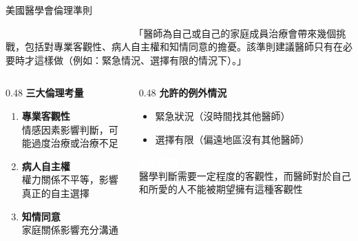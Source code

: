 \documentclass[aspectratio=169]{beamer}
\begin{document}
\begin{frame}{美國醫學會倫理準則}
\begin{block}{\textcolor{white}{AMA Code of Medical Ethics}}
「醫師為自己或自己的家庭成員治療會帶來幾個挑戰，包括對專業客觀性、病人自主權和知情同意的擔憂。該準則建議醫師只有在必要時才這樣做（例如：緊急情況、選擇有限的情況下）。」
\end{block}

\begin{columns}
\begin{column}{0.48\textwidth}
\textbf{\textcolor{medblue}{三大倫理考量}}
\begin{enumerate}
\item \textbf{專業客觀性}\\
情感因素影響判斷，可能過度治療或治療不足
\item \textbf{病人自主權}\\
權力關係不平等，影響真正的自主選擇
\item \textbf{知情同意}\\
家庭關係影響充分溝通
\end{enumerate}
\end{column}

\begin{column}{0.48\textwidth}
\textbf{\textcolor{medblue}{允許的例外情況}}
\begin{itemize}
\item 緊急狀況（沒時間找其他醫師）
\item 選擇有限（偏遠地區沒有其他醫師）
\end{itemize}

\vspace{0.5cm}
\textbf{\textcolor{white}{核心問題}}\\
醫學判斷需要一定程度的客觀性，而醫師對於自己和所愛的人不能被期望擁有這種客觀性
\end{column}
\end{columns}
\end{frame}
\end{document}
